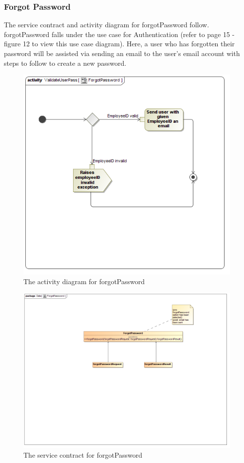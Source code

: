 \documentclass[a4paper,12pt]{report}
\begin{document}
\subsubsection{Forgot Password }
The service contract and activity diagram for forgotPassword follow. forgotPassword falls under the use case for Authentication (refer to page 15 - figure 12 to view this use case diagram). Here, a user who has forgotten their password will be assisted via sending an email to the user's email account with steps to follow to create a new password.
\begin{figure}[H]
  \centering
    \includegraphics[width=1.0\textwidth]{../images/ForgotPasswordActivity.png}
    \caption{The activity diagram for forgotPassword} 
\end{figure}
\begin{figure}[H]
  \centering
    \includegraphics[width=1.0\textwidth]{../images/ForgotPassword.png}
    \caption{The service contract for forgotPassword} 
\end{figure}
\end{document}
